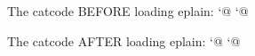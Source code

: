 The catcode BEFORE loading eplain: \the\catcode`@ \showthe\catcode`@


The catcode AFTER loading eplain: \the\catcode`@ \showthe\catcode`@

\bye
